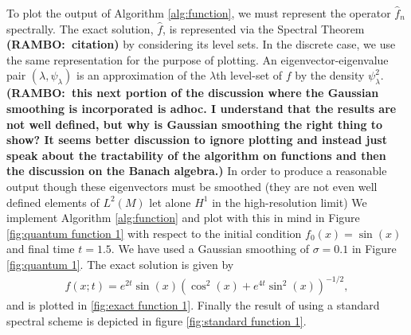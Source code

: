 \documentclass[final,leqno]{siamltex1213}
\newcommand{\ram}[1]{{\normalsize{\textbf{({\color{red}RAMBO:\ }#1)}}}}
\begin{document}
To plot the output of Algorithm \ref{alg:function}, we must represent the operator $\hat{f}_{n}$ spectrally.
The exact solution, $\hat{f}$, is represented via the Spectral Theorem \ram{citation} by considering its level sets.
In the discrete case, we use the same representation for the purpose of plotting.
An eigenvector-eigenvalue pair $(\lambda , \psi_{\lambda})$ is an approximation of the $\lambda$th level-set of $f$ by the density $\psi_{\lambda}^{2}$.
\ram{this next portion of the discussion where the Gaussian smoothing is incorporated is adhoc. I understand that the results are not well defined, but why is Gaussian smoothing the right thing to show? It seems better discussion to ignore plotting and instead just speak about the tractability of the algorithm on functions and then the discussion on the Banach algebra.}
In order to produce a reasonable output though these eigenvectors must be smoothed (they are not even well defined elements of $L^{2}(M)$ let alone $H^{1}$ in the high-resolution limit)
We implement Algorithm \ref{alg:function} and plot with this in mind in Figure \ref{fig:quantum function 1} with respect to the initial condition $f_{0}(x) = \sin(x)$ and final time $t=1.5$.
We have used a Gaussian smoothing of $\sigma=0.1$ in Figure \ref{fig:quantum 1}.
The exact solution is given by 
\begin{align}
	f(x;t) = e^{2t} \sin(x) \left( \cos^{2}(x) + e^{4t} \sin^{2}(x) \right)^{-1/2},
\end{align}
and is plotted in \ref{fig:exact function 1}.
Finally the result of using a standard spectral scheme is depicted in figure \ref{fig:standard function 1}.
\end{document}

